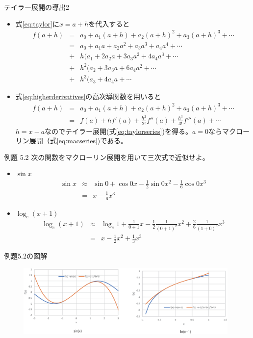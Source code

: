 \begin{slide}{テイラー展開の導出2}
\begin{itemize}
\item 式\ref{eq:taylor}に$x=a+h$を代入すると
\begin{eqnarray}
f(a+h) &=& a_0 + a_1 (a+h) + a_2 (a+h)^2 + a_3 (a+h)^3 +  \cdots \nonumber \\
&=& a_0 + a_1 a + a_2 a^2 + a_3 a^3 + a_4 a^4 + \cdots \nonumber \\
&+& h(a_1 + 2a_2a + 3a_3a^2 + 4a_4a^3 + \cdots \nonumber \\
&+& h^2(a_2 + 3a_3a + 6a_4 a^2 + \cdots \nonumber \\
&+& h^3(a_3 + 4a_4a + \cdots \nonumber 
\end{eqnarray}
\item 式\ref{eq:higherderivatives}の高次導関数を用いると
\begin{eqnarray}
f(a+h) &=& a_0 + a_1 (a+h) + a_2 (a+h)^2 + a_3 (a+h)^3 +  \cdots \nonumber \\
&=& f(a) +  hf'(a) + \frac{h^2}{2!}f''(a) + \frac{h^3}{3!}f'''(a) + \cdots  \nonumber
\end{eqnarray}
$h=x-a$なのでテイラー展開(式\ref{eq:taylorseries})を得る。$a=0$ならマクローリン展開（式\ref{eq:macseries})である。
\end{itemize}  
\end{slide}
\begin{slide}{例題 5.2}
次の関数をマクローリン展開を用いて三次式で近似せよ。
\begin{itemize}
\item $\sin{x}$ 
\begin{eqnarray}
\sin{x} &\approx& \sin{0}  + \cos{0}x -\frac{1}{2}\sin{0}x^2- \frac{1}{6}\cos{0}x^3 \nonumber  \\
&=& x - \frac{1}{6}x^3 
\end{eqnarray}
\item $\log_e{(x+1)}$
\begin{eqnarray}
\log_e{(x+1)} &\approx& \log_e{1} + \frac{1}{0+1} x - \frac{1}{2}\frac{1}{(0+1)^2} x^2 +\frac{2}{6} \frac{1}{(1+0)^3} x^3 \nonumber \\
&=& x - \frac{1}{2}x^2 + \frac{1}{3}x^3\nonumber 
\end{eqnarray}
\end{itemize}
\end{slide}
\begin{slide}{例題5.2の図解}
\begin{figure}[h]
\includegraphics[width=11cm]{calculus9/macapx.eps}
\end{figure}
\end{slide}
